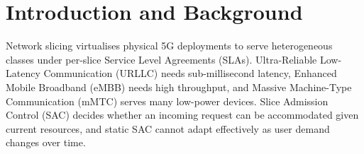 \documentclass[10pt]{article}
\begin{document}

\section{Introduction and Background}
Network slicing virtualises physical 5G deployments to serve
heterogeneous classes under per-slice Service Level Agreements
(SLAs). Ultra-Reliable Low-Latency Communication (URLLC) needs
sub-millisecond latency, Enhanced Mobile Broadband (eMBB) needs high
throughput, and Massive Machine-Type Communication (mMTC) serves
many low-power devices. Slice Admission Control (SAC) decides whether
an incoming request can be accommodated given current resources, and
static SAC cannot adapt effectively as user demand changes over time.
\end{document}
